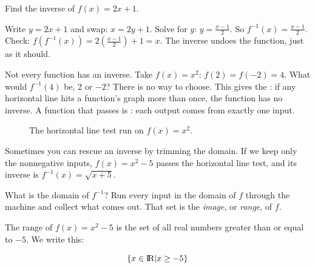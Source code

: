 \begin{Worked}
\begin{Problem}
Find the inverse of $f(x) = 2x + 1$.
\end{Problem}
\begin{Solution}
Write $y = 2x + 1$ and swap: $x = 2y + 1$. Solve for
$y$: $y = \frac{x - 1}{2}$. So $f^{-1}(x) = \frac{x - 1}{2}$. Check:
$f(f^{-1}(x)) = 2\left(\frac{x-1}{2}\right) + 1 = x$. The inverse undoes
the function, just as it should.
\end{Solution}
\end{Worked}

Not every function has an inverse. Take $f(x) = x^2$: $f(2) = f(-2) = 4$.
What would $f^{-1}(4)$ be, 2 or $-2$? There is no way to choose. This gives
the : if any horizontal line hits a function's
graph more than once, the function has no inverse. A function that passes
is : each output comes from
exactly one input.
\begin{figure}[H]
  \centering
  \caption{The horizontal line test run on $f(x)=x^2$.}
  \label{fig:hlt_func}
\end{figure}


Sometimes you can rescue an inverse by trimming the domain. If we keep only
the nonnegative inputs, $f(x) = x^2 - 5$ passes the horizontal line test,
and its inverse is $f^{-1}(x) = \sqrt{x + 5}$.

What is the domain of $f^{-1}$? Run every input in the domain of $f$
through the machine and collect what comes out. That set is the
\textit{image}, or \textit{range}, of $f$.

The range of $f(x) = x^2 - 5$ is the set of all real numbers greater than
or equal to $-5$. We write this:

\begin{equation*}
  \{ x \in {\rm I\!R} | x \geq -5 \}
\end{equation*}

